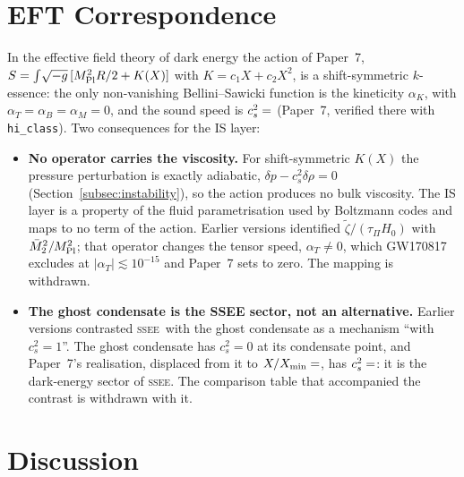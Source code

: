 \documentclass[12pt,a4paper]{article}
\newcommand{\SSEE}{\ifmmode\mathrm{SSEE}\else\textsc{ssee}\fi}
\newcommand{\tauPi}{\tau_\Pi}
\newcommand{\ztilde}{\tilde{\zeta}}
\begin{document}
\section{EFT Correspondence}
\label{sec:EFT}

In the effective field theory of dark energy \citep{Horndeski1974,Gubitosi2013,Bellini2015}
the action of Paper~7, $S=\int\!\sqrt{-g}\,[M_{\rm Pl}^2R/2+K(X)]$ with
$K=c_1X+c_2X^2$, is a shift-symmetric $k$-essence: the only non-vanishing
Bellini--Sawicki function is the kineticity $\alpha_K$, with
$\alpha_T=\alpha_B=\alpha_M=0$, and the sound speed is $c^2_s=\val{cs2_condensado_d6}$
(Paper~7, verified there with \texttt{hi\_class}). Two consequences for the IS layer:

\begin{itemize}
  \item \textbf{No operator carries the viscosity.} For shift-symmetric $K(X)$ the
    pressure perturbation is exactly adiabatic, $\delta p-c^2_s\delta\rho=0$
    (Section~\ref{subsec:instability}), so the action produces no bulk viscosity.
    The IS layer is a property of the fluid parametrisation used by Boltzmann codes
    and maps to no term of the action. Earlier versions identified
    $\ztilde/(\tauPi H_0)$ with $\bar M_2^2/M_{\rm Pl}^2$; that operator changes the
    tensor speed, $\alpha_T\neq0$, which GW170817 excludes at
    $|\alpha_T|\lesssim10^{-15}$ \citep{Abbott2017GW} and Paper~7 sets to zero. The
    mapping is withdrawn.
  \item \textbf{The ghost condensate is the SSEE sector, not an alternative.}
    Earlier versions contrasted \SSEE\ with the ghost condensate
    \citep{Arkani-Hamed2004} as a mechanism ``with $c^2_s=1$''. The ghost condensate
    has $c^2_s=0$ at its condensate point, and Paper~7's realisation, displaced from
    it to $X/X_{\min}=\val{X_sobre_Xmin_d6}$, has $c^2_s=\val{cs2_condensado_d6}$: it is
    the dark-energy sector of \SSEE. The comparison table that accompanied the
    contrast is withdrawn with it.
\end{itemize}

\section{Discussion}
\label{sec:discussion}
\end{document}
